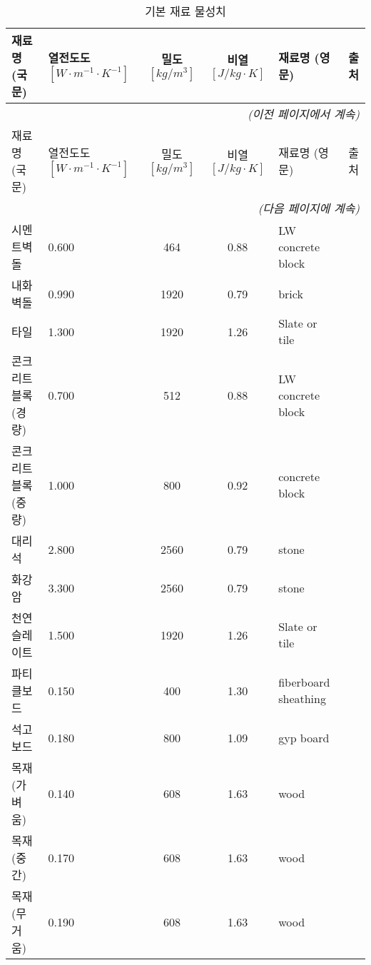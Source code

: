 \renewcommand{\arraystretch}{0.8}
\begin{longtable}{llcclc}
  \caption{기본 재료 물성치} \\
  \toprule
  재료명(국문) & \makecell{열전도도 \\ $[W{\cdot}m^{-1}{\cdot} K^{-1}]$}  & \makecell{밀도 \\ $[kg/m^{3}]$} & \makecell {비열 \\ $[J/kg\cdot K]$} & 재료명 (영문) &  출처 \\ \midrule
  \endfirsthead
  \multicolumn{6}{r}{\textit{(이전 페이지에서 계속)}} \\ \toprule
  재료명(국문) & \makecell{열전도도 \\ $[W{\cdot}m^{-1}{\cdot} K^{-1}]$}  & \makecell{밀도 \\ $[kg/m^{3}]$} & \makecell {비열 \\ $[J/kg\cdot K]$} & 재료명 (영문) & 출처 \\ \midrule
  \endhead
  \midrule \multicolumn{6}{r}{\textit{(다음 페이지에 계속)}} \\ \bottomrule
  \endfoot
  \bottomrule
  \endlastfoot
  시멘트벽돌 &   0.600 &  464 & 0.88 & LW concrete block & \cite{ashrae_f18} \\
  내화벽돌 &   0.990 & 1920 & 0.79 & brick & \cite{ashrae_f18} \\
  타일 &   1.300 & 1920 & 1.26 & Slate or tile & \cite{ashrae_f18} \\
  콘크리트블록(경량) &   0.700 &  512 & 0.88 & LW concrete block & \cite{ashrae_f18} \\
  콘크리트블록(중량) &   1.000 &  800 & 0.92 & concrete block & \cite{ashrae_f18} \\
  대리석 &   2.800 & 2560 & 0.79 & stone & \cite{ashrae_f18} \\
  화강암 &   3.300 & 2560 & 0.79 & stone & \cite{ashrae_f18} \\
  천연슬레이트 &   1.500 & 1920 & 1.26 & Slate or tile & \cite{ashrae_f18} \\
  파티클보드 &   0.150 &  400 & 1.30 & fiberboard sheathing & \cite{ashrae_f18} \\
  석고보드 &   0.180 &  800 & 1.09 & gyp board & \cite{ashrae_f18} \\
  목재(가벼움) &   0.140 &  608 & 1.63 & wood & \cite{ashrae_f18} \\
  목재(중간) &   0.170 &  608 & 1.63 & wood & \cite{ashrae_f18} \\
  목재(무거움) &   0.190 &  608 & 1.63 & wood & \cite{ashrae_f18} \\

\end{longtable}
